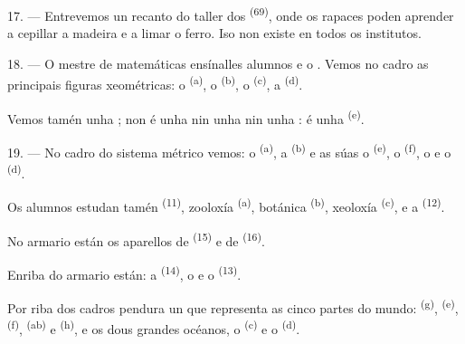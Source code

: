 17. --- Entrevemos un recanto do taller dos 
\textsuperscript{(69)}, onde os rapaces poden aprender a cepillar a madeira e a limar
o ferro. Iso non existe en todos os institutos.

\VUsaut{5.0mm}
\VUsaut{3.6mm}

18. --- O mestre de matemáticas ensínalles  alumnos
 e o . Vemos no cadro
as principais figuras xeométricas: o  \textsuperscript{(a)}, o
 \textsuperscript{(b)}, o  \textsuperscript{(c)}, a
 \textsuperscript{(d)}.

Vemos tamén unha ; non é unha  nin unha
 nin unha : é unha 
\textsuperscript{(e)}.

19. --- No cadro do sistema métrico vemos: o  \textsuperscript{(a)}, a
 \textsuperscript{(b)} e as súas  o 
\textsuperscript{(e)}, o  \textsuperscript{(f)}, o
 e o  \textsuperscript{(d)}.

Os alumnos estudan tamén  \textsuperscript{(11)},
zooloxía \textsuperscript{(a)}, botánica \textsuperscript{(b)}, xeoloxía
\textsuperscript{(c)}, e a  \textsuperscript{(12)}.

No armario están os aparellos de  \textsuperscript{(15)} e de
 \textsuperscript{(16)}.

Enriba do armario están: a  \textsuperscript{(14)}, o  e
o  \textsuperscript{(13)}.

Por riba dos cadros pendura un  que representa as cinco partes do mundo:
 \textsuperscript{(g)},  \textsuperscript{(e)},
 \textsuperscript{(f)},  \textsuperscript{(ab)} e
 \textsuperscript{(h)}, e os dous grandes océanos, o
 \textsuperscript{(c)} e o  \textsuperscript{(d)}.
\VUsaut{6.0mm}
\VUfilet{22mm}
